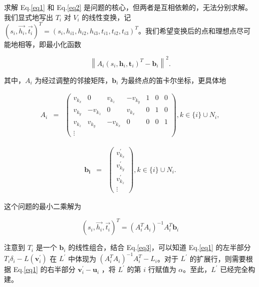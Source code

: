 \documentclass[lang=cn,11pt,a4paper]{elegantpaper}
\begin{document}
求解 Eq.\eqref{eq1} 和 Eq.\eqref{eq2} 是问题的核心，但两者是互相依赖的，无法分别求解。我们显式地写出 $T_i$ 对 $V_i$ 的线性变换，记 $(s_{i}, \vec{h_i}, \vec{t_i})^{T} = (s_{i}, h_{i1}, h_{i2}, h_{i3}, t_{i1}, t_{i2}, t_{i3})^{T}$。我们希望变换后的点和理想点尽可能地相等，即最小化函数

\begin{equation}
\left\|A_{i}\left(s_{i}, \mathbf{h}_{i}, \mathbf{t}_{i}\right)^{T}-\mathbf{b}_{i}\right\|^{2}.
\end{equation}

其中，$A_i$ 为经过调整的邻接矩阵，$\boldsymbol{b}_{i}$ 为最终点的笛卡尔坐标，更具体地

\begin{eqnarray}
A_{i} & = & \left(\begin{array}{ccccccc}
v_{k_{x}} & 0 & v_{k_{z}} & -v_{k_{y}} & 1 & 0 & 0 \\
v_{k_{y}} & -v_{k_{z}} & 0 & v_{k_{x}} & 0 & 1 & 0 \\
v_{k_{z}} & v_{k_{y}} & -v_{k_{x}} & 0 & 0 & 0 & 1 \\
\vdots & & & & & &
\end{array}\right), k \in\{i\} \cup N_{i},
\end{eqnarray}

\begin{eqnarray}
\mathbf{b}_{\mathbf{i}} & = & \left(\begin{array}{c}
v_{k_{x}}^{\prime} \\
v_{k_{y}}^{\prime} \\
v_{k_{z}}^{\prime} \\
\vdots
\end{array}\right), k \in\{i\} \cup N_{i}.
\end{eqnarray}

这个问题的最小二乘解为

\begin{equation}
    (s_{i}, \vec{h_i}, \vec{t_i})^{T} = \left(A_{i}^{T} A_{i}\right)^{-1} A_{i}^{T} \mathbf{b}_{i}\label{eq3}
\end{equation}

注意到 $T_i$ 是一个 $\mathbf{b}_{i}$ 的线性组合，结合 Eq.\eqref{eq3}，可以知道 Eq.\eqref{eq1} 的左半部分 $T_i\delta_{i}-L(\mathbf{v}_{i}^{\prime})$ 在 $L^{\prime}$ 中体现为 $\left(A_{i}^{T} A_{i}\right)^{-1} A_{i}^{T} - L_i$。对于 $L^{\prime}$ 的扩展行，则需要根据 Eq.\eqref{eq1} 的右半部分 $\mathbf{v}_{i}^{\prime}-\mathbf{u}_{i}$ ，将 $L^{\prime}$ 的第 $i$ 行赋值为 $\alpha$。至此，$L^{\prime}$ 已经完全构建。
\end{document}
